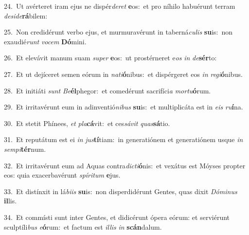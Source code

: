 {\numbfont\textcolor{\numbcolor}{24.}}~Ut avérteret iram ejus ne dispér\-\textit{de}\-\textit{ret} \textbf{e}\-os:~\star et pro níhilo habuérunt terram \textit{de}\-\textit{si}\textit{de}\textbf{rá}bilem:\par
{\numbfont\textcolor{\numbcolor}{25.}}~Non credidérunt verbo ejus, et murmuravérunt in taberná\-\textit{cu}\-\textit{lis} \textbf{su}\-is:~\star non exaudié\textit{runt} \textit{vo}\-\textit{cem} \textbf{Dó}\-mini.\par
{\numbfont\textcolor{\numbcolor}{26.}}~Et elevávit manum suam \textit{su}\-\textit{per} \textbf{e}\-os:~\star ut prostérneret e\textit{os} \textit{in} \textit{de}\-\textbf{sér}to:\par
{\numbfont\textcolor{\numbcolor}{27.}}~Et ut dejíceret semen eórum in \textit{na}\-\textit{ti}\textbf{ó}nibus:~\star et dispérgeret eos \textit{in} \textit{re}\-\textit{gi}\textbf{ó}nibus.\par
{\numbfont\textcolor{\numbcolor}{28.}}~Et initiáti \textit{sunt} \textit{Be}\-\textbf{él}phegor:~\star et comedérunt sacrifíci\textit{a} \textit{mor}\-\textit{tu}\textbf{ó}rum.\par
{\numbfont\textcolor{\numbcolor}{29.}}~Et irritavérunt eum in adinventió\-\textit{ni}\-\textit{bus} \textbf{su}\-is:~\star et multiplicáta est in \textit{e}\-\textit{is} \textit{ru}\-\textbf{í}na.\par
{\numbfont\textcolor{\numbcolor}{30.}}~Et stetit Phínees, \textit{et} \textit{pla}\-\textbf{cá}vit:~\star et ces\-\textit{sá}\-\textit{vit} \textit{quas}\-\textbf{sá}tio.\par
{\numbfont\textcolor{\numbcolor}{31.}}~Et reputátum est ei \textit{in} \textit{jus}\-\textbf{tí}tiam:~\star in generatiónem et generatiónem usque \textit{in} \textit{sem}\-\textit{pi}\textbf{tér}num.\par
{\numbfont\textcolor{\numbcolor}{32.}}~Et irritavérunt eum ad Aquas contra\-\textit{dic}\-\textit{ti}\textbf{ó}nis:~\star et vexátus est Móyses propter eos: quia exacerbavérunt \textit{spí}\-\textit{ri}\textit{tum} \textbf{e}\-jus.\par
{\numbfont\textcolor{\numbcolor}{33.}}~Et distínxit in lá\-\textit{bi}\-\textit{is} \textbf{su}\-is:~\star non disperdidérunt Gentes, quas dixit \textit{Dó}\-\textit{mi}\textit{nus} \textbf{il}\-lis.\par
{\numbfont\textcolor{\numbcolor}{34.}}~Et commísti sunt inter Gentes, et didicérunt ópera eórum: et serviérunt sculptíli\textit{bus} \textit{e}\-\textbf{ó}rum:~\star et factum est \textit{il}\-\textit{lis} \textit{in} \textbf{scán}\-dalum.\par
